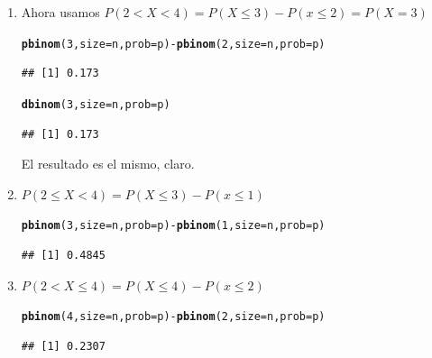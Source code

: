 \documentclass[10pt,a4paper]{article}\usepackage[]{graphicx}\usepackage[]{color}
\makeatletter
\newcommand{\hlnum}[1]{\textcolor[rgb]{0.686,0.059,0.569}{#1}}%
\newcommand{\hlopt}[1]{\textcolor[rgb]{0,0,0}{#1}}%
\newcommand{\hlstd}[1]{\textcolor[rgb]{0.345,0.345,0.345}{#1}}%
\newcommand{\hlkwc}[1]{\textcolor[rgb]{0.333,0.667,0.333}{#1}}%
\newcommand{\hlkwd}[1]{\textcolor[rgb]{0.737,0.353,0.396}{\textbf{#1}}}%
\newenvironment{kframe}{%
 \def\at@end@of@kframe{}%
 \ifinner\ifhmode%
  \def\at@end@of@kframe{\end{minipage}}%
  \begin{minipage}{\columnwidth}%
 \fi\fi%
 \def\FrameCommand##1{\hskip\@totalleftmargin \hskip-\fboxsep
 \colorbox{shadecolor}{##1}\hskip-\fboxsep
     \hskip-\linewidth \hskip-\@totalleftmargin \hskip\columnwidth}%
 \MakeFramed {\advance\hsize-\width
   \@totalleftmargin\z@ \linewidth\hsize
   \@setminipage}}%
 {\par\unskip\endMakeFramed%
 \at@end@of@kframe}
\newenvironment{knitrout}{}{} %
\makeatother
\begin{document}
\begin{enumerate}
  \item Ahora usamos $P(2< X < 4) = P(X\leq 3) - P(x\leq 2) = P(X=3)$
\begin{knitrout}
\color{fgcolor}\begin{kframe}
\begin{alltt}
\hlkwd{pbinom}\hlstd{(}\hlnum{3}\hlstd{,} \hlkwc{size} \hlstd{= n,} \hlkwc{prob} \hlstd{= p)} \hlopt{-} \hlkwd{pbinom}\hlstd{(}\hlnum{2}\hlstd{,} \hlkwc{size} \hlstd{= n,} \hlkwc{prob} \hlstd{= p)}
\end{alltt}
\begin{verbatim}
## [1] 0.173
\end{verbatim}
\begin{alltt}
\hlkwd{dbinom}\hlstd{(}\hlnum{3}\hlstd{,} \hlkwc{size} \hlstd{= n,} \hlkwc{prob} \hlstd{= p)}
\end{alltt}
\begin{verbatim}
## [1] 0.173
\end{verbatim}
\end{kframe}
\end{knitrout}
      El resultado es el mismo, claro.

  \item $P(2 \leq X < 4) = P(X\leq 3) - P(x\leq 1)$
\begin{knitrout}
\color{fgcolor}\begin{kframe}
\begin{alltt}
\hlkwd{pbinom}\hlstd{(}\hlnum{3}\hlstd{,} \hlkwc{size} \hlstd{= n,} \hlkwc{prob} \hlstd{= p)} \hlopt{-} \hlkwd{pbinom}\hlstd{(}\hlnum{1}\hlstd{,} \hlkwc{size} \hlstd{= n,} \hlkwc{prob} \hlstd{= p)}
\end{alltt}
\begin{verbatim}
## [1] 0.4845
\end{verbatim}
\end{kframe}
\end{knitrout}

  \item $P(2< X \leq  4) = P(X\leq 4) - P(x\leq 2)$
\begin{knitrout}
\color{fgcolor}\begin{kframe}
\begin{alltt}
\hlkwd{pbinom}\hlstd{(}\hlnum{4}\hlstd{,} \hlkwc{size} \hlstd{= n,} \hlkwc{prob} \hlstd{= p)} \hlopt{-} \hlkwd{pbinom}\hlstd{(}\hlnum{2}\hlstd{,} \hlkwc{size} \hlstd{= n,} \hlkwc{prob} \hlstd{= p)}
\end{alltt}
\begin{verbatim}
## [1] 0.2307
\end{verbatim}
\end{kframe}
\end{knitrout}
\end{enumerate}
\end{document}
